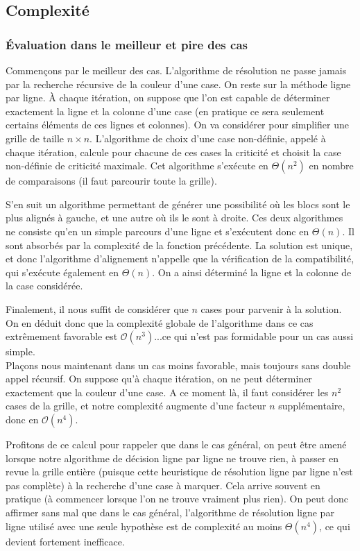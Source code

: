 \documentclass{report}
\begin{document}
\subsection{Complexité}
\subsubsection{Évaluation dans le meilleur et pire des cas}
Commençons par le meilleur des cas. L'algorithme de résolution ne passe jamais par la recherche récursive de la couleur d'une case. On reste sur la méthode ligne par ligne. À chaque itération, on suppose que l'on est capable de déterminer exactement la ligne et la colonne d'une case (en pratique ce sera seulement certains éléments de ces lignes et colonnes). On va considérer pour simplifier une grille de taille $n\times n$. L'algorithme de choix d'une case non-définie, appelé à chaque itération, calcule pour chacune de ces cases la criticité et choisit la case non-définie de criticité maximale. Cet algorithme s'exécute en $\Theta(n^2)$ en nombre de comparaisons (il faut parcourir toute la grille).

S'en suit un algorithme permettant de générer une possibilité où les blocs sont le plus alignés à gauche, et une autre où ils le sont à droite. Ces deux algorithmes ne consiste qu'en un simple parcours d'une ligne et s'exécutent donc en $\Theta(n)$. Il sont absorbés par la complexité de la fonction précédente. La solution est unique, et donc l'algorithme d'alignement n'appelle que la vérification de la compatibilité, qui s'exécute également en $\Theta(n)$. On a ainsi déterminé la ligne et la colonne de la case considérée.

Finalement, il nous suffit de considérer que $n$ cases pour parvenir à la solution. On en déduit donc que la complexité globale de l'algorithme dans ce cas extrêmement favorable est $\mathcal{O}(n^3)$...ce qui n'est pas formidable pour un cas aussi simple.\\


Plaçons nous maintenant dans un cas moins favorable, mais toujours sans double appel récursif. On suppose qu'à chaque itération, on ne peut déterminer exactement que la couleur d'une case. A ce moment là, il faut considérer les $n^2$ cases de la grille, et notre complexité augmente d'une facteur $n$ supplémentaire, donc en $\mathcal{O}(n^4)$.

Profitons de ce calcul pour rappeler que dans le cas général, on peut être amené lorsque notre algorithme de décision ligne par ligne ne trouve rien, à passer en revue la grille entière (puisque cette heuristique de résolution ligne par ligne n'est pas complète) à la recherche d'une case à marquer. Cela arrive souvent en pratique (à commencer lorsque l'on ne trouve vraiment plus rien). On peut donc affirmer sans mal que dans le cas général, l'algorithme de résolution ligne par ligne utilisé avec une seule hypothèse est de complexité au moins $\Theta(n^4)$, ce qui devient fortement inefficace.
\end{document}
